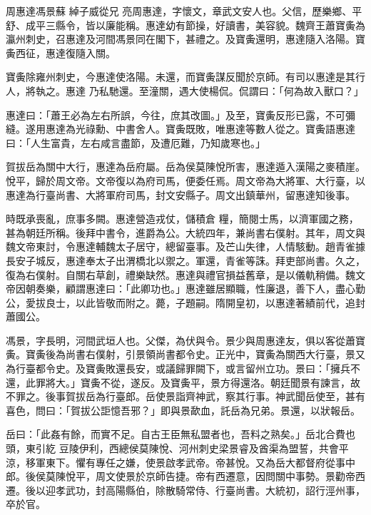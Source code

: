 
\begin{pinyinscope}

 周惠達馮景蘇
 綽子威從兄
 亮周惠達，字懷文，章武文安人也。父信，歷樂鄉、平舒、成平三縣令，皆以廉能稱。惠達幼有節操，好讀書，美容貌。魏齊王蕭寶夤為瀛州刺史，召惠達及河間馮景同在閣下，甚禮之。及寶夤還明，惠達隨入洛陽。寶夤西征，惠達復隨入關。



 寶夤除雍州刺史，今惠達使洛陽。未還，而寶夤謀反聞於京師。有司以惠達是其行人，將執之。惠達
 乃私馳還。至潼關，遇大使楊侃。侃謂曰：「何為故入獸口？」



 惠達曰：「蕭王必為左右所誤，今往，庶其改圖。」及至，寶夤反形已露，不可彌縫。遂用惠達為光祿勳、中書舍人。寶夤既敗，唯惠達等數人從之。寶夤語惠達曰：「人生富貴，左右咸言盡節，及遭厄難，乃知歲寒也。」



 賀拔岳為關中大行，惠達為岳府屬。岳為侯莫陳悅所害，惠達遁入漢陽之麥積崖。悅平，歸於周文帝。文帝復以為府司馬，便委任焉。周文帝為大將軍、大行臺，以惠達為行臺尚書、大將軍府司馬，封文安縣子。周文出鎮華州，留惠達知後事。



 時既承喪亂，庶事多闕。惠達營造戎仗，儲積倉
 糧，簡閱士馬，以濟軍國之務，甚為朝廷所稱。後拜中書令，進爵為公。大統四年，兼尚書右僕射。其年，周文與魏文帝東討，令惠達輔魏太子居守，總留臺事。及芒山失律，人情駭動。趙青雀據長安子城反，惠達奉太子出渭橋北以禦之。軍還，青雀等誅。拜吏部尚書。久之，復為右僕射。自關右草創，禮樂缺然。惠達與禮官損益舊章，是以儀軌稍備。魏文帝因朝奏樂，顧謂惠達曰：「此卿功也。」惠達雖居顯職，性廉退，善下人，盡心勤公，愛拔良士，以此皆敬而附之。薨，子題嗣。隋開皇初，以惠達著績前代，追封蕭國公。



 馮景，字長明，河間武垣人也。父傑，為伏與令。景少與周惠達友，俱以客從蕭寶夤。寶夤後為尚書右僕射，引景領尚書都令史。正光中，寶夤為關西大行臺，景又為行臺都令史。及寶夤敗還長安，或議歸罪闕下，或言留州立功。景曰：「擁兵不還，此罪將大。」寶夤不從，遂反。及寶夤平，景方得還洛。朝廷聞景有諫言，故不罪之。後事賀拔岳為行臺郎。岳使景詣齊神武，察其行事。神武聞岳使至，甚有喜色，問曰：「賀拔公詎憶吾邪？」即與景歃血，託岳為兄弟。景還，以狀報岳。



 岳曰：「此姦有餘，而實不足。自古王臣無私盟者也，吾料之熟矣。」岳北合費也頭，東引紇
 豆陵伊利，西總侯莫陳悅、河州刺史梁景睿及酋渠為盟誓，共會平涼，移軍東下。懼有專任之嫌，使景啟孝武帝。帝甚悅。又為岳大都督府從事中郎。後侯莫陳悅平，周文使景於京師告捷。帝有西遷意，因問關中事勢。景勸帝西遷。後以迎孝武功，封高陽縣伯，除散騎常侍、行臺尚書。大統初，詔行涇州事，卒於官。




\end{pinyinscope}
